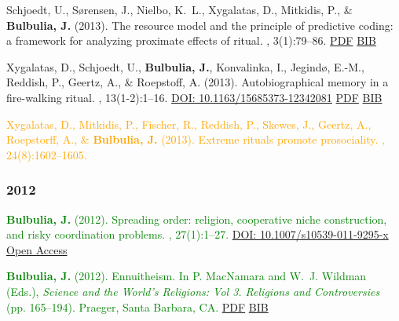 \documentclass{article}
\begin{document}
\begin{thebibliography}{99}
Schjoedt, U., S{\o}rensen, J., Nielbo, K.~L., Xygalatas, D., Mitkidis, P., \&
  {\bf Bulbulia, J.} (2013).
\newblock The resource model and the principle of predictive coding: a
  framework for analyzing proximate effects of ritual.
, 3(1):79--86.
\href{https://www.dropbox.com/s/sqmgtkag4zbu3nc/schjoedtetall2013Framework.pdf?dl=0}{PDF} \href{https://scholar.google.co.nz/scholar.bib?q=info:DB2umFzhr70J:scholar.google.com/&output=citation&scisig=AAGBfm0AAAAAVTM86rinZ5ScIM9di3Db8hA7UdmttQQN&scisf=4&hl=en}{BIB}


Xygalatas, D., Schjoedt, U., {\bf Bulbulia, J.}, Konvalinka, I., Jegind{\o}, E.-M.,
  Reddish, P., Geertz, A., \& Roepstoff, A. (2013).
\newblock Autobiographical memory in a fire-walking ritual.
, 13(1-2):1--16. 
\href{https://doi.org/10.1163/15685373-12342081}{DOI: 10.1163/15685373-12342081}
\href{https://www.dropbox.com/s/3srdqka56fe7av3/JOCC_Xygalatas_et_al_2013.pdf}{PDF} \href{https://www.dropbox.com/s/yc0vqndj8w8hn05/2013.xygalat.memory.bib?dl=0}{BIB}


\textcolor{Orange}{Xygalatas, D., Mitkidis, P., Fischer, R., Reddish, P., Skewes, J., Geertz,
  A., Roepstorff, A., \& {\bf Bulbulia, J.} (2013).
\newblock Extreme rituals promote prosociality.
, 24(8):1602--1605.} %

\subsubsection*{2012} 

\textcolor{Green}{{\bf Bulbulia, J.} (2012).
\newblock Spreading order: religion, cooperative niche construction, and risky
  coordination problems.
, 27(1):1--27.}
\href{https://doi.org/10.1007/s10539-011-9295-x}{DOI: 10.1007/s10539-011-9295-x}
\href{http://www.springerlink.com/content/e4208k071t6164k7/}{Open Access} %


\textcolor{Green}{{\bf Bulbulia, J.} (2012).
\newblock Ennuitheism.
\newblock In P. MacNamara and W.~J. Wildman (Eds.), {\em Science and the
  World's Religions: Vol 3. Religions and Controversies} (pp. 165--194). Praeger, Santa Barbara, CA.} \href{https://www.dropbox.com/s/wgm2tsi4safdmc3/2012_Ennuitheism-bulbulia_published.pdf?dl=0}{PDF} \href{https://www.dropbox.com/s/aalocq092iqrw01/2012.Bulbulia.Ennuitheism.bib?dl=0}{BIB}



\end{thebibliography}
\end{document}
